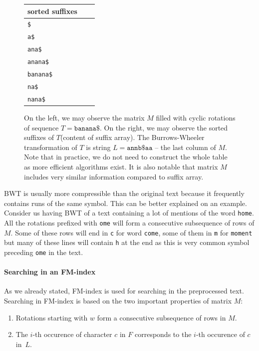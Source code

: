 \begin{figure}
{	\begin{tabular}{l l l}
		sorted suffixes\\
	\hline
		\tt \$ \\
		\tt a\$ \\
		\tt ana\$ \\
		\tt anana\$ \\
		\tt banana\$ \\
		\tt na\$ \\
		\tt nana\$ \\
	\end{tabular}
	}
	\caption[TODO]{On the left, we may observe the matrix $M$ filled with cyclic rotations of sequence
	$T = \mathtt{banana\$}$. On the right, we may observe the sorted suffixes of $T$(content of suffix array). The
	Burrows-Wheeler transformation of $T$ is string $L=\mathtt{annb\$aa}$ -- the last column of $M$.
	Note that in practice, we do not need to construct the whole table as more efficient algorithms exist.
	It is also notable that matrix $M$ includes very similar information compared to suffix array.
	}
	\label{obr:BWT}
\end{figure}

BWT is usually more compressible than the original text because it frequently contains runs of the same
symbol. This can be better explained on an example. Consider us having BWT of a text containing
a lot of mentions of the word {\tt home}. All the rotations prefixed with {\tt ome} will form a
consecutive subsequence of rows of $M$. Some of these rows will end in {\tt c} for word {\tt come},
some of them in {\tt m} for {\tt moment} but many of these lines will contain {\tt h} at the end as this
is very common symbol preceding {\tt ome} in the text.

\paragraph{Searching in an FM-index}

As we already stated, FM-index is used for searching in the preprocessed text.
Searching in FM-index is based on the two important properties of matrix $M$:

\begin{enumerate}
	\item Rotations starting with $w$ form a consecutive subsequence of rows in $M$.
	\label{chapter1:fmindexprop:prop1}
	\item The $i$-th occurence of character $c$ in $F$ corresponds to the $i$-th occurence of $c$ in~$L$.
	\label{chapter1:fmindexprop:prop2}
\end{enumerate}

